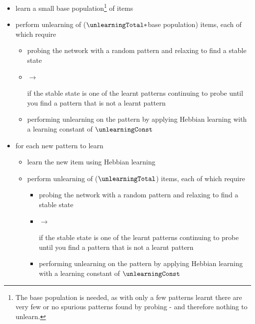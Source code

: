 \begin{itemize}[topsep=1ex, leftmargin=1cm, labelsep=0.2cm, itemindent=0pt,label=\textbullet]
	\item learn a small base population\footnote{The base population is needed, as with only a few patterns learnt there are very few or no spurious patterns found by probing - and therefore nothing to unlearn.} of items
	\item perform unlearning of ($\unlearningTotal*$base population) items, each of which require
	\begin{itemize}[topsep=1ex, leftmargin=1cm, labelsep=0.2cm, itemindent=0pt,label=\textbullet]
		\item probing the network with a random pattern and relaxing to find a stable state
		\item \hspace{-1cm}\parbox{0.4cm}{$\rightarrow$}\hspace{.6cm}if the stable state is one of the learnt patterns continuing to probe until you find a pattern that is not a learnt pattern
		\item performing unlearning on the pattern by applying Hebbian learning with a learning constant of $\unlearningConst$
	\end{itemize}
	\item for each new pattern to learn
	\begin{itemize}[topsep=1ex, leftmargin=1cm, labelsep=0.2cm, itemindent=0pt,label=\textbullet]
		\item learn the new item using Hebbian learning
		\item perform unlearning of ($\unlearningTotal$) items, each of which require
		\begin{itemize}[topsep=1ex, leftmargin=1cm, labelsep=0.2cm, itemindent=0pt,label=\textbullet]
			\item probing the network with a random pattern and relaxing to find a stable state
			\item \hspace{-1cm}\parbox{0.4cm}{$\rightarrow$}\hspace{.6cm}if the stable state is one of the learnt patterns continuing to probe until you find a pattern that is not a learnt pattern
			\item performing unlearning on the pattern by applying Hebbian learning with a learning constant of $\unlearningConst$
		\end{itemize}
	\end{itemize}
\end{itemize}

